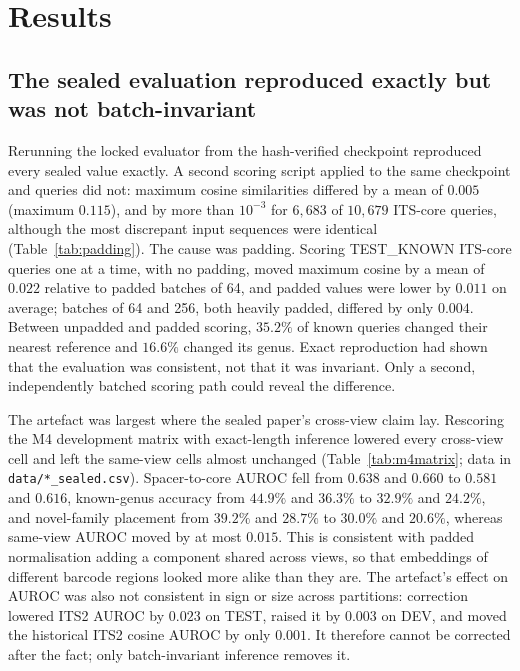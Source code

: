 \documentclass[11pt]{article}
\begin{document}
\section{Results}
\subsection{The sealed evaluation reproduced exactly but was not batch-invariant}
\label{sec:invariance}
Rerunning the locked evaluator from the hash-verified checkpoint reproduced every
sealed value exactly. A second scoring script applied to the same checkpoint and
queries did not: maximum cosine similarities differed by a mean of $0.005$
(maximum $0.115$), and by more than $10^{-3}$ for $6{,}683$ of $10{,}679$
ITS-core queries, although the most discrepant input sequences were identical
(Table~\ref{tab:padding}). The cause was padding. Scoring TEST\_KNOWN ITS-core
queries one at a time, with no padding, moved maximum cosine by a mean of
$0.022$ relative to padded batches of 64, and padded values were lower by
$0.011$ on average; batches of 64 and 256, both heavily padded, differed by only
$0.004$. Between unpadded and padded scoring, $35.2\%$ of known queries changed
their nearest reference and $16.6\%$ changed its genus. Exact reproduction had
shown that the evaluation was consistent, not that it was invariant. Only a
second, independently batched scoring path could reveal the difference.

The artefact was largest where the sealed paper's cross-view claim lay.
Rescoring the M4 development matrix with exact-length inference lowered every
cross-view cell and left the same-view cells almost unchanged
(Table~\ref{tab:m4matrix}; data in \texttt{data/*\_sealed.csv}). Spacer-to-core
AUROC fell from $0.638$ and $0.660$ to $0.581$ and $0.616$, known-genus accuracy
from $44.9\%$ and $36.3\%$ to $32.9\%$ and $24.2\%$, and novel-family placement
from $39.2\%$ and $28.7\%$ to $30.0\%$ and $20.6\%$, whereas same-view AUROC
moved by at most $0.015$. This is consistent with padded normalisation adding a
component shared across views, so that embeddings of different barcode regions
looked more alike than they are. The artefact's effect on AUROC was also not
consistent in sign or size across partitions: correction lowered ITS2 AUROC by
$0.023$ on TEST, raised it by $0.003$ on DEV, and moved the historical ITS2
cosine AUROC by only $0.001$. It therefore cannot be corrected after the fact;
only batch-invariant inference removes it.
\end{document}
